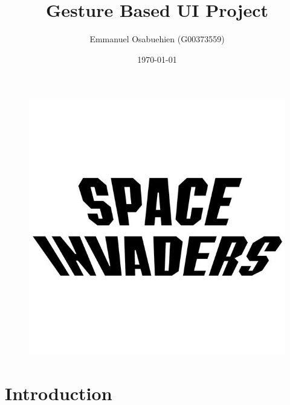 \documentclass{article}
\title{Gesture Based UI Project}
\author{Emmanuel Osabuehien (G00373559)}
\date{\today}
\begin{document}
\maketitle

\begin{figure}[h]
  \includegraphics[width=\textwidth]{img/spaceinvaders2.jpg}
  \centering
  \label{fig: Picture of the Space Invaders Logo}
\end{figure}

\pagebreak

\tableofcontents

\pagebreak

\section{Introduction}
\end{document}
